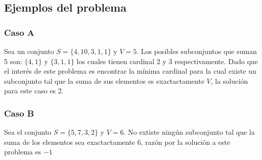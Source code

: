 \subsection{Ejemplos del problema}
\subsubsection{Caso A}
Sea un conjunto $S = \{ 4, 10,3,1,1\}$ y $V=5$. Los posibles subconjuntos que suman 5 son: $\{4,1 \}$ y $\{3,1,1\}$
los cuales tienen cardinal 2 y 3 respectivamente. Dado que el inter\'es de este problema es encontrar la 
m\'inima cardinal para la cual existe un subconjunto tal que la suma de sus elementos es exactactamente $V$, la 
soluci\'on para este caso es $2$.
\subsubsection{Caso B}
Sea el conjunto $S = \{ 5, 7 ,3,2\}$ y $V=6$. No extiste ning\'un subconjunto tal que la suma de los elementos
sea exactactamente $6$, raz\'on por la soluci\'on a este problema es $-1$